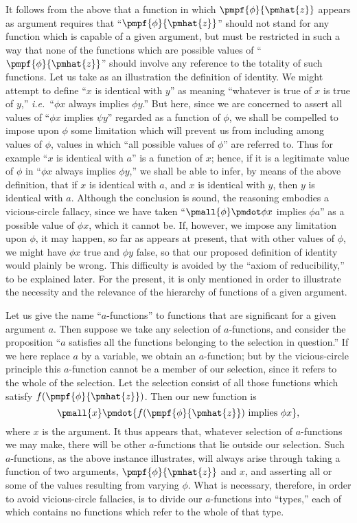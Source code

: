 \documentclass[letterpaper,12pt,openany,leqno]{book}
\newcommand{\pagefirst}[1]{\marginnote[\boxed{\text{#1}}]{\boxed{\text{#1}}}}
\begin{document}
It follows from the above that a function in which $\pmpf{\phi}{\pmhat{z}}$ appears as argument requires that ``$\pmpf{\phi}{\pmhat{z}}$'' should not stand for any function which is capable of a given argument, but must be restricted in such a way that none of the functions which are possible values of ``$\pmpf{\phi}{\pmhat{z}}$'' should involve any reference to the totality of such functions. Let us take as an illustration the definition of identity. We might attempt to define ``$x$ is identical with $y$'' as meaning ``whatever is true of $x$ is true of $y$,'' \textit{i.e.}\ ``$\phi x$ always implies $\phi y$.'' But here, \pagefirst{52} since we are concerned to assert all values of ``$\phi x$ implies $\psi y$'' regarded as a function of $\phi$, we shall be compelled to impose upon $\phi$ some limitation which will prevent us from including among values of $\phi$, values in which ``all possible values of $\phi$'' are referred to. Thus for example ``$x$ is identical with $a$'' is a function of $x$; hence, if it is a legitimate value of $\phi$ in ``$\phi x$ always implies $\phi y$,'' we shall be able to infer, by means of the above definition, that if $x$ is identical with $a$, and $x$ is identical with $y$, then $y$ is identical with $a$. Although the conclusion is sound, the reasoning embodies a vicious-circle fallacy, since we have taken ``$\pmall{\phi}\pmdot \phi x$ implies $\phi a$'' as a possible value of $\phi x$, which it cannot be. If, however, we impose any limitation upon $\phi$, it may happen, so far as appears at present, that with other values of $\phi$, we might have $\phi x$ true and $\phi y$ false, so that our proposed definition of identity would plainly be wrong. This difficulty is avoided by the ``axiom of reducibility,'' to be explained later. For the present, it is only mentioned in order to illustrate the necessity and the relevance of the hierarchy of functions of a given argument.

Let us give the name ``$a$-functions'' to functions that are significant for a given argument $a$. Then suppose we take any selection of $a$-functions, and consider the proposition ``$a$ satisfies all the functions belonging to the selection in question.'' If we here replace $a$ by a variable, we obtain an $a$-function; but by the vicious-circle principle this $a$-function cannot be a member of our selection, since it refers to the whole of the selection. Let the selection consist of all those functions which satisfy $f(\pmpf{\phi}{\pmhat{z}})$. Then our new function is
\[
	\pmall{x}\pmdot \{f(\pmpf{\phi}{\pmhat{z}}) \text{ implies } \phi x\},
\]
where $x$ is the argument. It thus appears that, whatever selection of $a$-functions we may make, there will be other $a$-functions that lie outside our selection. Such $a$-functions, as the above instance illustrates, will always arise through taking a function of two arguments, $\pmpf{\phi}{\pmhat{z}}$ and $x$, and asserting all or some of the values resulting from varying $\phi$. What is necessary, therefore, in order to avoid vicious-circle fallacies, is to divide our $a$-functions into ``types,'' each of which contains no functions which refer to the whole of that type.
\end{document}
